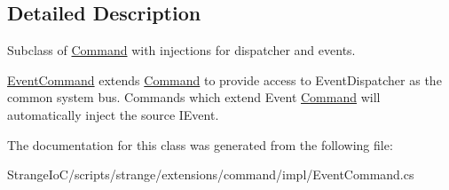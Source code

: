 \subsection{Detailed Description}
Subclass of \hyperlink{classstrange_1_1extensions_1_1command_1_1impl_1_1_command}{Command} with injections for dispatcher and events. 

\hyperlink{classstrange_1_1extensions_1_1command_1_1impl_1_1_event_command}{Event\-Command} extends \hyperlink{classstrange_1_1extensions_1_1command_1_1impl_1_1_command}{Command} to provide access to Event\-Dispatcher as the common system bus. Commands which extend Event \hyperlink{classstrange_1_1extensions_1_1command_1_1impl_1_1_command}{Command} will automatically inject the source I\-Event. 

The documentation for this class was generated from the following file\-:\begin{DoxyCompactItemize}
\item 
Strange\-Io\-C/scripts/strange/extensions/command/impl/Event\-Command.\-cs\end{DoxyCompactItemize}
